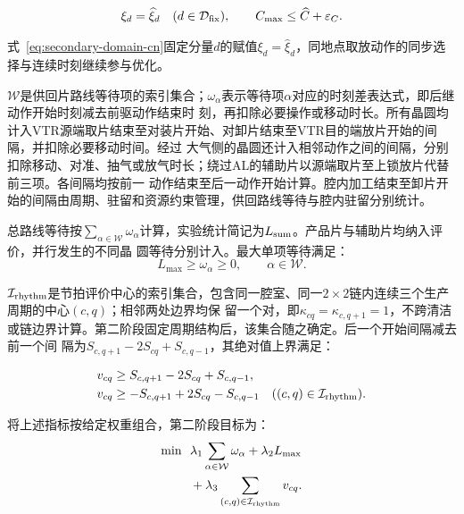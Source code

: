 \begin{equation}
\begin{gathered}
\xi_d=\widehat\xi_d\quad(d\in\mathcal D_{\rm fix}),\qquad
C_{\max}\le\widehat C+\varepsilon_C.
\end{gathered}
\label{eq:secondary-domain-cn}
\end{equation}

式~\eqref{eq:secondary-domain-cn}固定分量$d$的赋值$\xi_d=\widehat\xi_d$，同地点取放动作的同步选择与连续时刻继续参与优化。

$\mathcal W$是供回片路线等待项的索引集合；$\omega_\alpha$表示等待项$\alpha$对应的时刻差表达式，即后继动作开始时刻减去前驱动作结束时
刻，再扣除必要操作或移动时长。所有晶圆均计入VTR源端取片结束至对装片开始、对卸片结束至VTR目的端放片开始的间隔，并扣除必要移动时间。经过
大气侧的晶圆还计入相邻动作之间的间隔，分别扣除移动、对准、抽气或放气时长；绕过AL的辅助片以源端取片至上锁放片代替前三项。各间隔均按前一
动作结束至后一动作开始计算。腔内加工结束至卸片开始的间隔由周期、驻留和资源约束管理，供回路线等待与腔内驻留分别统计。

总路线等待按$\sum_{\alpha\in\mathcal W}\omega_\alpha$计算，实验统计简记为$L_{\rm sum}$。产品片与辅助片均纳入评价，并行发生的不同晶
圆等待分别计入。最大单项等待满足：
\begin{equation}
L_{\max}\ge\omega_\alpha\ge0,\qquad \alpha\in\mathcal W.
\label{eq:secondary-wait-cn}
\end{equation}

$\mathcal I_{\rm rhythm}$是节拍评价中心的索引集合，包含同一腔室、同一$2\times2$链内连续三个生产周期的中心$(c,q)$；相邻两处边界均保
留一个对，即$\kappa_{cq}=\kappa_{c,q+1}=1$，不跨清洁或链边界计算。第二阶段固定周期结构后，该集合随之确定。后一个开始间隔减去前一个间
隔为$S_{c,q+1}-2S_{cq}+S_{c,q-1}$，其绝对值上界满足：

\begin{equation}
\begin{aligned}
v_{cq}&\ge S_{c,q+1}-2S_{cq}+S_{c,q-1},\\
v_{cq}&\ge-S_{c,q+1}+2S_{cq}-S_{c,q-1}
\quad((c,q)\in\mathcal I_{\rm rhythm}).
\end{aligned}
\label{eq:secondary-rhythm-cn}
\end{equation}

将上述指标按给定权重组合，第二阶段目标为：
\begin{equation}
\begin{aligned}
\min\ \ &\lambda_1\sum_{\alpha\in\mathcal W}\omega_\alpha+\lambda_2L_{\max}\\
&+\lambda_3\sum_{(c,q)\in\mathcal I_{\rm rhythm}}v_{cq}.
\end{aligned}
\label{eq:secondary-objective-cn}
\end{equation}

